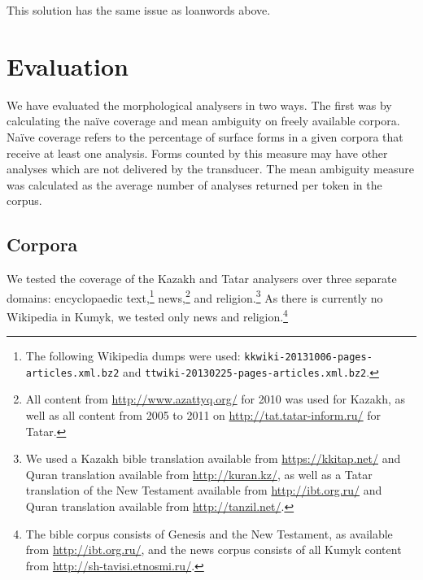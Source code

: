 \documentclass[a4paper,11pt,twocolumn]{article}
\begin{document}

This solution has the same issue as loanwords above.


\section{Evaluation}\label{sec:evaluation}

We have evaluated the morphological analysers in two ways. The first was by calculating the naïve coverage and mean ambiguity on freely available corpora. Naïve coverage refers to the percentage of surface forms in a given corpora that receive at least one analysis.  Forms counted by this measure may have other analyses which are not delivered by the transducer. The mean ambiguity measure was calculated as the average number of analyses returned per token in the corpus.


\subsection{Corpora}

We tested the coverage of the Kazakh and Tatar analysers over three separate domains: encyclopaedic text,\footnote{The following Wikipedia dumps were used: \texttt{kkwiki-20131006-pages-articles.xml.bz2} and \texttt{ttwiki-20130225-pages-articles.xml.bz2}.}
 news,\footnote{All content from \url{http://www.azattyq.org/} for 2010 was used for Kazakh, as well as all content from 2005 to 2011 on \url{http://tat.tatar-inform.ru/} for Tatar.} and religion.\footnote{We used a Kazakh bible translation available from \url{https://kkitap.net/} and Quran translation available from \url{http://kuran.kz/}, as well as a Tatar translation of the New Testament available from \url{http://ibt.org.ru/} and Quran translation available from \url{http://tanzil.net/}.}  As there is currently no Wikipedia in Kumyk, we tested only news and religion.\footnote{The bible corpus consists of Genesis and the New Testament, as available from \url{http://ibt.org.ru/}, and the news corpus consists of all Kumyk content from \url{http://sh-tavisi.etnosmi.ru/}.}


\end{document}
